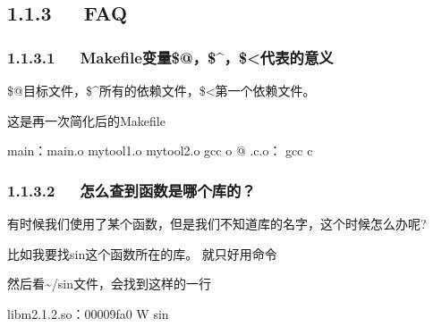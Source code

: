\documentclass[letterpaper,12pt,english]{sphinxmanual}
\begin{document}



\subsection{1.1.3   FAQ}
\label{\detokenize{001software/001install/make:faq}}

\subsubsection{1.1.3.1   Makefile变量\$@，\$\textasciicircum{}，\$\textless{}代表的意义}
\label{\detokenize{001software/001install/make:makefile}}

\$@目标文件，\$\textasciicircum{}所有的依赖文件，\$\textless{}第一个依赖文件。

这是再一次简化后的Makefile

\begin{sphinxVerbatim}[commandchars=\\\{\}]
main：main.o mytool1.o mytool2.o
gcc \PYGZhy{}o \PYGZdl{}@ \PYGZdl{}\PYGZca{}
.c.o：
gcc \PYGZhy{}c \PYGZdl{}\PYGZlt{}
\end{sphinxVerbatim}


\subsubsection{1.1.3.2   怎么查到函数是哪个库的？}
\label{\detokenize{001software/001install/make:id4}}
有时候我们使用了某个函数，但是我们不知道库的名字，这个时候怎么办呢?

比如我要找sin这个函数所在的库。 就只好用命令

\begin{sphinxVerbatim}[commandchars=\\\{\}]
  \PYGZbs{} 
\end{sphinxVerbatim}

然后看\textasciitilde{}/sin文件，会找到这样的一行

\begin{sphinxVerbatim}[commandchars=\\\{\}]
libm\PYGZhy{}2.1.2.so：00009fa0 W sin
\end{sphinxVerbatim}
\end{document}
